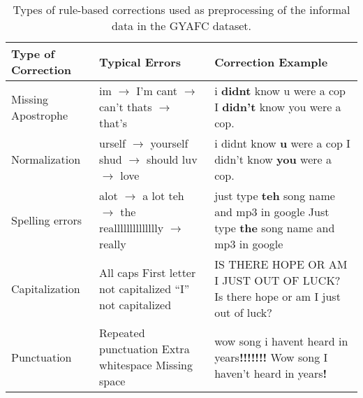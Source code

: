 \begin{table}[h]
\centering
 \begin{tabular}{|| p{3.5cm} | p{3.5cm} | p{5cm} ||} 
 \hline
 Type of Correction & Typical Errors & Correction Example \\ [0.3ex] 
 \hline\hline
 Missing Apostrophe & im $\rightarrow$ I'm 
                    \newline cant $\rightarrow$ can't
                    \newline thats $\rightarrow$ that's
                    & i \textbf{didnt} know u were a cop \newline I \textbf{didn't} know you were a cop. \\
 \hline
 Normalization      & urself $\rightarrow$ yourself
                    \newline shud $\rightarrow$ should
                    \newline luv $\rightarrow$ love
                    & i didnt know \textbf{u} were a cop \newline I didn't know \textbf{you} were a cop. \\
 \hline
 Spelling errors      & alot $\rightarrow$ a lot 
                    \newline teh $\rightarrow$ the
                    \newline realllllllllllllly $\rightarrow$ really
                    & just type \textbf{teh} song name and mp3 in google \newline Just type \textbf{the} song name and mp3 in google \\
 \hline
 Capitalization     & All caps
                    \newline First letter not capitalized
                    \newline ``I'' not capitalized
                    & IS THERE HOPE OR AM I JUST OUT OF LUCK? \newline Is there hope or am I just out of luck? \\
 \hline
 Punctuation        & Repeated punctuation
                    \newline Extra whitespace
                    \newline Missing space
                    & wow song i havent heard in years\textbf{!!!!!!!} \newline Wow song I haven't heard in years\textbf{!} \\
 \hline
\end{tabular}
\caption{Types of rule-based corrections used as preprocessing of the informal data in the GYAFC dataset.}
\label{gyafcpreprocessing}
\end{table}

